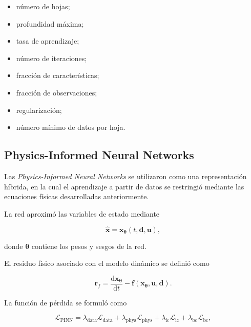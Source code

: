 \begin{itemize}
    \item número de hojas;
    \item profundidad máxima;
    \item tasa de aprendizaje;
    \item número de iteraciones;
    \item fracción de características;
    \item fracción de observaciones;
    \item regularización;
    \item número mínimo de datos por hoja.
\end{itemize}

\subsection{Physics-Informed Neural Networks}
\label{subsec:pinn_metodologia}

Las \textit{Physics-Informed Neural Networks} se utilizaron como una representación híbrida, en la cual el aprendizaje a partir de datos se restringió mediante las ecuaciones físicas desarrolladas anteriormente.

La red aproximó las variables de estado mediante

\begin{equation}
\hat{\mathbf{x}}
=
\mathbf{x}_{\boldsymbol{\theta}}
\left(
t,
\mathbf{d},
\mathbf{u}
\right),
\label{eq:pinn_estado}
\end{equation}

donde $\boldsymbol{\theta}$ contiene los pesos y sesgos de la red.

El residuo físico asociado con el modelo dinámico se definió como

\begin{equation}
\mathbf{r}_{f}
=
\frac{\mathrm{d}\mathbf{x}_{\boldsymbol{\theta}}}{\mathrm{d}t}
-
\mathbf{f}
\left(
\mathbf{x}_{\boldsymbol{\theta}},
\mathbf{u},
\mathbf{d}
\right).
\label{eq:residuo_pinn_metodologia}
\end{equation}

La función de pérdida se formuló como

\begin{equation}
\mathcal{L}_{\mathrm{PINN}}
=
\lambda_{\mathrm{data}}
\mathcal{L}_{\mathrm{data}}
+
\lambda_{\mathrm{phys}}
\mathcal{L}_{\mathrm{phys}}
+
\lambda_{\mathrm{ic}}
\mathcal{L}_{\mathrm{ic}}
+
\lambda_{\mathrm{bc}}
\mathcal{L}_{\mathrm{bc}},
\label{eq:loss_pinn_metodologia}
\end{equation}

